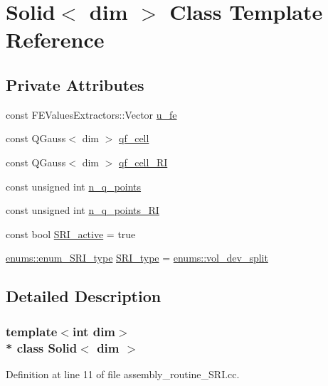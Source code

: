 \hypertarget{classSolid}{}\section{Solid$<$ dim $>$ Class Template Reference}
\label{classSolid}
\subsection*{Private Attributes}
\begin{DoxyCompactItemize}
\item 
const F\+E\+Values\+Extractors\+::\+Vector \hyperlink{classSolid_a4de5ae991dbf3dcb928d0e40b9eae6dd}{u\+\_\+fe}
\item 
const Q\+Gauss$<$ dim $>$ \hyperlink{classSolid_adcd7596f6521749c8a4c7ffda312df8c}{qf\+\_\+cell}
\item 
const Q\+Gauss$<$ dim $>$ \hyperlink{classSolid_ab97c4ff4672fdb470c8a33fd0aac4650}{qf\+\_\+cell\+\_\+\+RI}
\item 
const unsigned int \hyperlink{classSolid_ae5a57e65024a6a944d6b7fdbefe7d758}{n\+\_\+q\+\_\+points}
\item 
const unsigned int \hyperlink{classSolid_a2a85d197b565f9a057f90e72e8d20560}{n\+\_\+q\+\_\+points\+\_\+\+RI}
\item 
const bool \hyperlink{classSolid_a421ff1b855d09ee75f2ea5b1a9642607}{S\+R\+I\+\_\+active} = true
\item 
\hyperlink{namespaceenums_ad159a7d6539f111883db3b07c09601a8}{enums\+::enum\+\_\+\+S\+R\+I\+\_\+type} \hyperlink{classSolid_a0d12ca91579ebfa7c292b48506eca1e2}{S\+R\+I\+\_\+type} = \hyperlink{namespaceenums_ad159a7d6539f111883db3b07c09601a8ad2c871b65148302b24a39fac6cedfd40}{enums\+::vol\+\_\+dev\+\_\+split}
\end{DoxyCompactItemize}


\subsection{Detailed Description}
\subsubsection*{template$<$int dim$>$\\*
class Solid$<$ dim $>$}



Definition at line 11 of file assembly\+\_\+routine\+\_\+\+S\+R\+I.\+cc.



